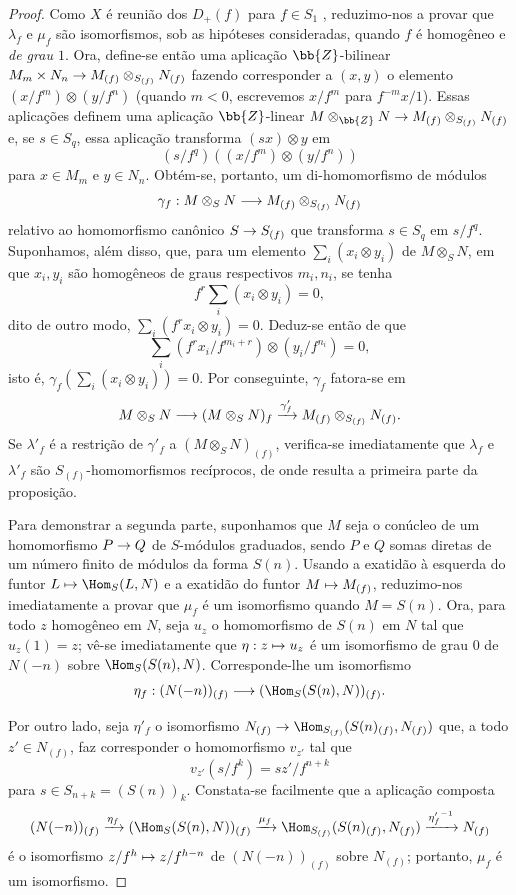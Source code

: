 \documentclass[oneside,10pt]{amsart}
\makeatletter
\newcommand{\ega@arrow}[2]{\mathchoice{#1}{#2}{#2}{#2}}
\let\ega@shortmapsto\mapsto
\renewcommand{\to}{\ega@arrow{\longrightarrow}{\rightarrow}}
\renewcommand{\mapsto}{\ega@arrow{\longmapsto}{\ega@shortmapsto}}
\newcommand{\oldpage}[2][]{\marginnote{\normalfont\footnotesize\textbf{#1}~|~#2}\ignorespaces}
\makeatother
\begin{document}
\begin{proof}
Como $X$ é reunião dos $D_+(f)$ para $f\in S_1$ , reduzimo-nos a provar que $\lambda_f$ e $\mu_f$ são isomorfismos, sob as hipóteses consideradas, quando $f$ é homogêneo e \emph{de grau $1$}.
Ora, define-se então uma aplicação $\bb{Z}$-bilinear $M_m\times N_n\to M_{(f)}\otimes_{S_{(f)}}N_{(f)}$ fazendo corresponder a $(x,y)$ o elemento $(x/f^m)\otimes(y/f^n)$ (quando $m<0$, escrevemos $x/f^m$ para $f^{-m}x/1$).
Essas aplicações definem uma aplicação $\bb{Z}$-linear $M\otimes_{\bb{Z}}N\to M_{(f)}\otimes_{S_{(f)}}N_{(f)}$ e, se $s\in S_q$, essa aplicação transforma $(sx)\otimes y$ em
\[
  (s/f^q)((x/f^m)\otimes(y/f^n))
\]
para $x\in M_m$ e $y\in N_n$.
Obtém-se, portanto, um di-homomorfismo de módulos
\[
  \gamma_f:M\otimes_S N\to M_{(f)}\otimes_{S_{(f)}}N_{(f)}
\]
relativo ao homomorfismo canônico $S\to S_{(f)}$ que transforma $s\in S_q$ em $s/f^q$.
Suponhamos, além disso, que, para um elemento $\sum_i(x_i\otimes y_i)$ de $M\otimes_S N$, em que $x_i,y_i$ são homogêneos de graus respectivos $m_i,n_i$, se tenha
\[
  f^r\sum_i(x_i\otimes y_i)=0,
\]
dito de outro modo, $\sum_i(f^rx_i\otimes y_i)=0$.
Deduz-se então de  que
\[
  \sum_i(f^rx_i/f^{m_i+r})\otimes(y_i/f^{n_i})=0,
\]
isto é, $\gamma_f(\sum_i(x_i\otimes y_i))=0$.
Por conseguinte, $\gamma_f$ fatora-se em
\[
  M\otimes_S N\to(M\otimes_S N)_f
  \xrightarrow{\gamma'_f}M_{(f)}\otimes_{S_{(f)}}N_{(f)}.
\]
Se $\lambda'_f$ é a restrição de $\gamma'_f$
\oldpage[II]{35}
a $(M\otimes_S N)_{(f)}$, verifica-se imediatamente que $\lambda_f$ e $\lambda'_f$ são $S_{(f)}$-homomorfismos recíprocos, de onde resulta a primeira parte da proposição.

Para demonstrar a segunda parte, suponhamos que $M$ seja o conúcleo de um homomorfismo $P\to Q$ de $S$-módulos graduados, sendo $P$ e $Q$ somas diretas de um número finito de módulos da forma $S(n)$.
Usando a exatidão à esquerda do funtor $L\mapsto\Hom_S(L,N)$ e a exatidão do funtor $M\mapsto M_{(f)}$, reduzimo-nos imediatamente a provar que $\mu_f$ é um isomorfismo quando $M=S(n)$.
Ora, para todo $z$ homogêneo em $N$, seja $u_z$ o homomorfismo de $S(n)$ em $N$ tal que $u_z(1)=z$; vê-se imediatamente que $\eta:z\mapsto u_z$ é um isomorfismo de grau $0$ de $N(-n)$ sobre $\Hom_S(S(n),N)$.
Corresponde-lhe um isomorfismo
\[
  \eta_f:(N(-n))_{(f)}\to(\Hom_S(S(n),N))_{(f)}.
\]

Por outro lado, seja $\eta'_f$ o isomorfismo $N_{(f)}\to\Hom_{S_{(f)}}(S(n)_{(f)},N_{(f)})$ que, a todo $z'\in N_{(f)}$, faz corresponder o homomorfismo $v_{z'}$ tal que
\[
  v_{z'}(s/f^k)=sz'/f^{n+k}
\]
para $s\in S_{n+k}=(S(n))_k$.
Constata-se facilmente que a aplicação composta
\[
  (N(-n))_{(f)}
  \xrightarrow{\eta_f}(\Hom_S(S(n),N))_{(f)}
  \xrightarrow{\mu_f}\Hom_{S_{(f)}}(S(n)_{(f)},N_{(f)})
  \xrightarrow{{\eta'_f}^{-1}}N_{(f)}
\]
é o isomorfismo $z/f^h\mapsto z/f^{h-n}$ de $(N(-n))_{(f)}$ sobre $N_{(f)}$; portanto, $\mu_f$ é um isomorfismo.
\end{proof}
\end{document}
